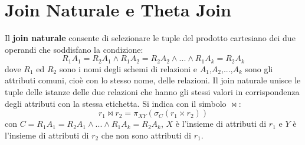 \section{Join Naturale e Theta Join}
\begin{redbar}
    Il \textbf{join naturale} consente di selezionare le tuple del prodotto cartesiano dei due operandi che soddisfano la condizione:
    \begin{equation*}
        R_1A_1=R_2A_1\land R_1A_2= R_2A_2\land ...\land R_1A_k=R_2A_k
    \end{equation*}
    dove $R_1$ ed $R_2$ sono i nomi degli schemi di relazioni e $A_1$,$A_2$,...,$A_k$ sono gli attributi comuni, cioè con lo stesso nome, delle relazioni. Il join naturale unisce le tuple delle istanze delle due relazioni che hanno gli stessi valori in corrispondenza degli attributi con la stessa etichetta. Si indica con il simbolo $\bowtie$:
    \begin{equation*}
        r_1 \bowtie r_2 = \pi_{XY}(\sigma_C(r_1 \times r_2 ))
    \end{equation*}
    con $C=R_1A_1=R_2A_1\land ...\land R_1A_k=R_2A_k$, $X$ è l'insieme di attributi di $r_1$ e $Y$ è l'insieme di attributi di $r_2$ che non sono attributi di $r_1$.
\end{redbar}

